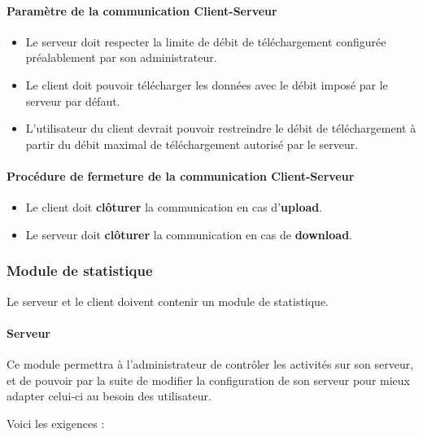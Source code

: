 \documentclass[10pt,a4paper]{report}
\begin{document}
\paragraph{\textbf{Paramètre de la communication Client-Serveur}}

\begin{itemize}[label = $\triangleright$]
\item Le serveur doit respecter la limite de débit de téléchargement configurée préalablement par son administrateur.
\item Le client doit pouvoir télécharger les données avec le débit imposé par le serveur par défaut.
\item L'utilisateur du client devrait pouvoir restreindre le débit de téléchargement à partir du débit maximal de téléchargement autorisé par le serveur. 
\end{itemize}

\paragraph{\textbf{Procédure de fermeture de la communication Client-Serveur}}

\begin{itemize}[label = $\triangleright$]
\item Le client doit \textbf{clôturer} la communication en cas d'\textbf{upload}.

\item Le serveur doit \textbf{clôturer} la communication en cas de \textbf{download}. 
\end{itemize}

\subsubsection{Module de statistique}

Le serveur et le client doivent contenir un module de statistique.


\paragraph{\textbf{Serveur\\}}

Ce module permettra à l'administrateur de contrôler les activités sur son serveur, et de pouvoir par la suite de modifier la configuration de son serveur pour mieux adapter celui-ci au besoin des utilisateur.

Voici les exigences :
\end{document}
